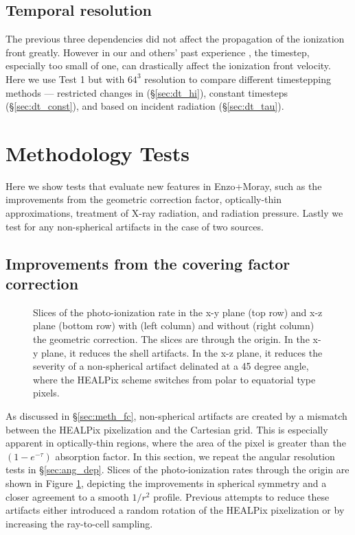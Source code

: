 \documentclass[12pt,preprint]{aastex}
\begin{document}
\subsection{Temporal resolution}
\label{sec:dt_dep}

The previous three dependencies did not affect the propagation of the
ionization front greatly.  However in our and others' past experience
\citep[e.g.][\bf{+others!}]{Petkova09}, the timestep, especially too
small of one, can drastically affect the ionization front velocity.
Here we use Test 1 but with $64^3$ resolution to compare different
timestepping methods --- restricted changes in 
(\S\ref{sec:dt_hi}), constant timesteps (\S\ref{sec:dt_const}), and
based on incident radiation (\S\ref{sec:dt_tau}).

\section{Methodology Tests}

Here we show tests that evaluate new features in Enzo+Moray, such as
the improvements from the geometric correction factor, optically-thin
approximations, treatment of X-ray radiation, and radiation pressure.
Lastly we test for any non-spherical artifacts in the case of two
sources.

\subsection{Improvements from the covering factor correction}
\label{sec:test_fc}

\begin{figure}[t]
  \caption{\label{fig:fc_slices} Slices of the photo-ionization rate
    in the x-y plane (top row) and x-z plane (bottom row) with (left
    column) and without (right column) the geometric correction.  The
    slices are through the origin.  In the x-y plane, it reduces the
    shell artifacts.  In the x-z plane, it reduces the severity of a
    non-spherical artifact delinated at a 45 degree angle, where the
    HEALPix scheme switches from polar to equatorial type pixels.}
\end{figure}

As discussed in \S\ref{sec:meth_fc}, non-spherical artifacts are
created by a mismatch between the HEALPix pixelization and the
Cartesian grid.  This is especially apparent in optically-thin
regions, where the area of the pixel is greater than the
$(1-e^{-\tau})$ absorption factor.  In this section, we repeat the
angular resolution tests in \S\ref{sec:ang_dep}.  Slices of the
photo-ionization rates through the origin are shown in Figure
\ref{fig:fc_slices}, depicting the improvements in spherical symmetry
and a closer agreement to a smooth $1/r^2$ profile.  Previous attempts
to reduce these artifacts either introduced a random rotation of the
HEALPix pixelization \citep[e.g.][]{Abel02_RT, Trac07, Krumholz07_ART}
or by increasing the ray-to-cell sampling.
\end{document}
